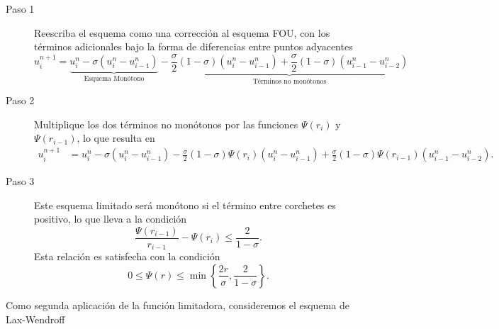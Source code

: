 \begin{description}
	\item[Paso 1]
	      Reescriba el esquema como una corrección al esquema FOU, con los
	      términos adicionales bajo la forma de diferencias entre puntos adyacentes
	      \begin{equation*}
		      u_{i}^{n+1}=
		      \underbrace{
			      u_{i}^{n}-
			      \sigma\left(u_i^n-u_{i-1}^n\right)}_{\text{Esquema Monótono}}-
		      \underbrace{
			      \frac{\sigma}{2}
			      \left(1-\sigma\right)
			      \left(u_{i}^{n}-u_{i-1}^{n}\right)+
			      \frac{\sigma}{2}
			      \left(1-\sigma\right)
			      \left(u_{i-1}^{n}-u_{i-2}^{n}\right)}_{\text {Términos no monótonos}}
	      \end{equation*}

	\item[Paso 2]

	      Multiplique los dos términos no monótonos por las funciones
	      $\Psi\left(r_{i}\right)$ y $\Psi\left(r_{i-1}\right)$,
	      lo que resulta en
	      \begin{align*}
		      u_{i}^{n+1} & =
		      u_{i}^{n}-
		      \sigma\left(u_i^n-u_{i-1}^n\right)-
		      \frac{\sigma}{2}
		      \left(1-\sigma\right)
		      \Psi\left(r_{i}\right)
		      \left(u_{i}^{n}-u_{i-1}^{n}\right)+
		      \frac{\sigma}{2}
		      \left(1-\sigma\right)
		      \Psi\left(r_{i-1}\right)
		      \left(u_{i-1}^{n}-u_{i-2}^{n}\right).
	      \end{align*}

	\item[Paso 3]

	      Este esquema limitado será monótono si el término entre
	      corchetes es positivo, lo que lleva a la condición
	      \begin{equation*}
		      \frac{\Psi\left(r_{i-1}\right)}{r_{i-1}}-
		      \Psi\left(r_{i}\right)\leq
		      \frac{2}{1-\sigma}.
	      \end{equation*}
	      Esta relación es satisfecha con la condición
	      \begin{equation*}
		      0\leq\Psi\left(r\right)\leq
		      \min\left\{\frac{2r}{\sigma},\frac{2}{1-\sigma}\right\}.
	      \end{equation*}
\end{description}

Como segunda aplicación de la función limitadora, consideremos el
esquema de Lax-Wendroff

